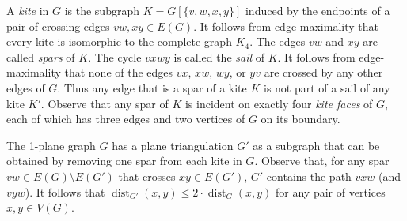\documentclass{patmorin}
\DeclareMathOperator{\dist}{dist}
\begin{document}
A \emph{kite} in $G$ is the subgraph $K=G[\{v,w,x,y\}]$ induced by the endpoints of a pair of crossing edges $vw,xy\in E(G)$.  It follows from edge-maximality that every kite is isomorphic to the complete graph $K_4$.
The edges $vw$ and $xy$ are called \emph{spars} of $K$.  The cycle $vxwy$ is called the \emph{sail} of $K$.  It follows from edge-maximality that none of the edges $vx$, $xw$, $wy$, or $yv$ are crossed by any other edges of $G$. Thus any edge that is a spar of a kite $K$ is not part of a sail of any kite $K'$. Observe that any spar of $K$ is incident on exactly four \emph{kite faces} of $G$, each of which has three edges and two vertices of $G$ on its boundary.

The 1-plane graph $G$ has a plane triangulation $G'$ as a subgraph that can be obtained by removing one spar from each kite in $G$.  Observe that, for any spar $vw\in E(G)\setminus E(G')$ that crosses $xy\in E(G')$, $G'$ contains the path $vxw$ (and $vyw$).  It follows that $\dist_{G'}(x,y)\le 2\cdot\dist_G(x,y)$ for any pair of vertices $x,y\in V(G)$.
\end{document}
